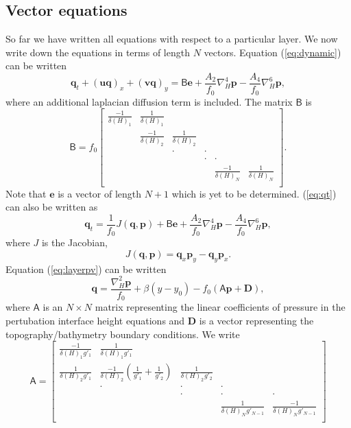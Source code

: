 \documentclass[11pt, a4paper,twoside]{article}
\newcommand{\gp}[2]{{}^{#1}g'_{#2}}
\newcommand{\at}[1]{{{}^{#1}A_2}}
\newcommand{\ah}[1]{{{}^{#1}A_4}}
\newcommand{\vc}[1]{\mathbf{#1}}
\newcommand{\mtx}[1]{\vc{\mathsf{#1}}}
\numberwithin{equation}{section}
\begin{document}
\subsection{Vector equations}

So far we have written all equations with respect to a particular layer. We now write down the equations in terms of length $N$ vectors. Equation (\ref{eq:dynamic}) can be written
\begin{equation}\label{eq:qt}
\vc{q}_t  + \left(\vc{u}\vc{q}\right)_x  + \left(\vc{v}\vc{q}\right)_y  = \mtx{B}\vc{e} + \frac{A_2}{f_0}\nabla_H^4\vc{p} - \frac{A_4}{f_0}\nabla_H^6\vc{p},
\end{equation}
where an additional laplacian diffusion term is included. The matrix $\mtx{B}$ is
\begin{equation}
\mtx{B} = f_0
\left[ \begin{array}{cccccc}
\frac{-1}{\delta(H)_1} & \frac{1}{\delta(H)_1} & &\\
 & \frac{-1}{\delta(H)_2} & \frac{1}{\delta(H)_2} &\\
 & &  \cdot & \cdot \\
 & &  & \cdot & \cdot \\
 & &   & & \frac{-1}{\delta(H)_N}& \frac{1}{\delta(H)_N} \\
 \end{array}\right].
\end{equation}
Note that $\vc{e}$ is a vector of length $N+1$ which is yet to be determined.
(\ref{eq:qt}) can also be written as
\begin{equation}\label{eq:qt2}
\vc{q}_t  = \frac{1}{f_0} J(\vc{q},\vc{p}) + \mtx{B}\vc{e}  + \frac{\at{}}{f_0}\nabla_H^4 \vc{p} - \frac{\ah{}}{f_0}\nabla_H^6 \vc{p},
\end{equation}
where $J$ is the Jacobian,
\[J(\vc{q},\vc{p}) =\vc{q}_x\vc{p}_y - \vc{q}_y\vc{p}_x.\]
Equation (\ref{eq:layerpv}) can be written
\begin{equation}\label{eq:layerpv2}
\vc{q} = \frac{\nabla_H^2 \vc{p}}{f_0} + \beta(y - y_0) - f_0\left(\mtx{A}\vc{p} + \vc{D}\right),
\end{equation}
where $\mtx{A}$ is an $N\times N$ matrix representing the linear coefficients of pressure in the pertubation interface height equations and $\vc{D}$ is a vector representing the topography/bathymetry boundary conditions. 
We write
\begin{equation}\label{eq:mata}
\mtx{A} =
\left[ \begin{array}{cccccc}
    \frac{-1}{\delta(H)_1 \gp{}{1}} & \frac{1}{\delta(H)_1 \gp{}{1}} &&\\
    \frac{1}{\delta(H)_2 \gp{}{1}}  & \frac{-1}{\delta(H)_2}\left(\frac{1}{\gp{}{1}} + \frac{1}{\gp{}{2}}\right) & \frac{1}{\delta(H)_2 \gp{}{2}} &\\
&  \cdot & \cdot& \cdot\\
 &&  \cdot & \cdot& \cdot\\
&  & &   \frac{1}{\delta(H)_N \gp{}{N-1}}& \frac{-1}{\delta(H)_N \gp{}{N-1}} \\
 \end{array}\right]
\end{equation}
\end{document}
